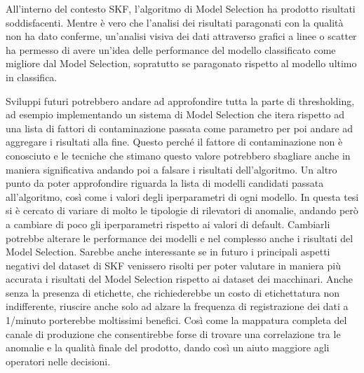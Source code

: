 All'interno del contesto SKF, l'algoritmo di Model Selection ha prodotto risultati soddisfacenti. Mentre è vero che l'analisi dei risultati paragonati con la qualità non ha dato conferme, un'analisi visiva dei dati attraverso grafici a linee o scatter ha permesso di avere un'idea delle performance del modello classificato come migliore dal Model Selection, sopratutto se paragonato rispetto al modello ultimo in classifica. 

Sviluppi futuri potrebbero andare ad approfondire tutta la parte di thresholding, ad esempio implementando un sistema di Model Selection che itera rispetto ad una lista di fattori di contaminazione passata come parametro per poi andare ad aggregare i risultati alla fine. Questo perché il fattore di contaminazione non è conosciuto e le tecniche che stimano questo valore potrebbero sbagliare anche in maniera significativa andando poi a falsare i risultati dell'algoritmo.
Un altro punto da poter approfondire riguarda la lista di modelli candidati passata all'algoritmo, così come i valori degli iperparametri di ogni modello. In questa tesi si è cercato di variare di molto le tipologie di rilevatori di anomalie, andando però a cambiare di poco gli iperparametri rispetto ai valori di default. Cambiarli potrebbe alterare le performance dei modelli e nel complesso anche i risultati del Model Selection.
Sarebbe anche interessante se in futuro i principali aspetti negativi del dataset di SKF venissero risolti per poter valutare in maniera più accurata i risultati del Model Selection rispetto ai dataset dei macchinari. Anche senza la presenza di etichette, che richiederebbe un costo di etichettatura non indifferente, riuscire anche solo ad alzare la frequenza di registrazione dei dati a 1/minuto porterebbe moltissimi benefici. Così come la mappatura completa del canale di produzione che consentirebbe forse di trovare una correlazione tra le anomalie e la qualità finale del prodotto, dando così un aiuto maggiore agli operatori nelle decisioni.